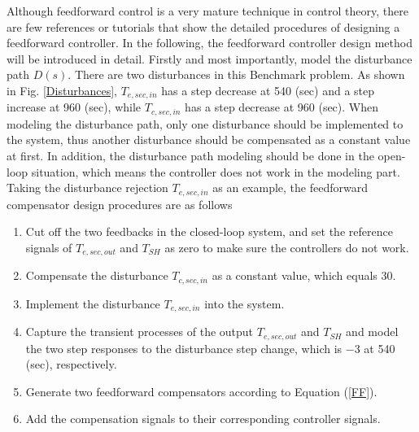 \documentclass{ifacconf}
\begin{document}
Although feedforward control is a very mature technique in control theory, there are few references or tutorials that show the detailed procedures of designing a feedforward controller. In the following, the feedforward controller design method will be introduced in detail. Firstly and most importantly, model the disturbance path $D(s)$. There are two disturbances in this Benchmark problem. As shown in Fig. \ref{Disturbances}, $T_{e,sec,in}$ has a step decrease at 540 (sec) and a step increase at 960 (sec), while $T_{c,sec,in}$ has a step decrease at 960 (sec). When modeling the disturbance path, only one disturbance should be implemented to the system, thus another disturbance should be compensated as a constant value at first. In addition, the disturbance path modeling should be done in the open-loop situation, which means the controller does not work in the modeling part. Taking the disturbance rejection $T_{e,sec,in}$ as an example, the feedforward compensator design procedures are as follows

\begin{enumerate}
  \item Cut off the two feedbacks in the closed-loop system, and set the reference signals of $T_{e,sec,out}$ and $T_{SH}$ as zero to make sure the controllers do not work.
  \item Compensate the disturbance $T_{c,sec,in}$ as a constant value, which equals 30.
  \item Implement the disturbance $T_{e,sec,in}$ into the system.%
  \item Capture the transient processes of the output $T_{e,sec,out}$ and $T_{SH}$ and model the two step responses to the disturbance step change, which is $-3$ at 540 (sec), respectively.
  \item Generate two feedforward compensators according to Equation (\ref{FF}).
  \item Add the compensation signals to their corresponding controller signals.
 \end{enumerate}


%
\end{document}

